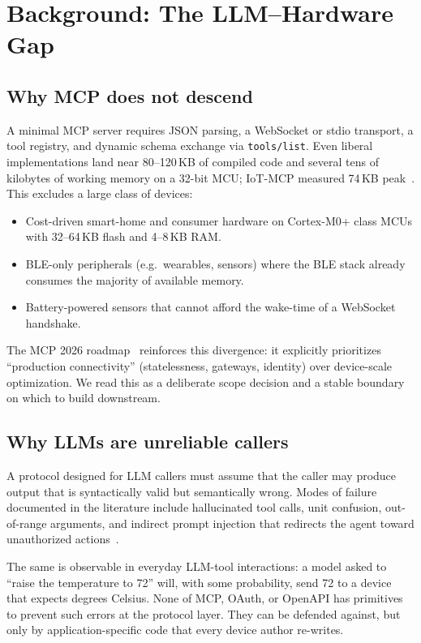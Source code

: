 \documentclass[11pt,a4paper]{article}
\begin{document}
\section{Background: The LLM--Hardware Gap}

\subsection{Why MCP does not descend}

A minimal MCP server requires JSON parsing, a WebSocket or stdio transport,
a tool registry, and dynamic schema exchange via \texttt{tools/list}. Even
liberal implementations land near 80--120\,KB of compiled code and several
tens of kilobytes of working memory on a 32-bit MCU; IoT-MCP measured
74\,KB peak~\cite{iotmcp2025}. This excludes a large class of devices:

\begin{itemize}[leftmargin=*,nosep]
  \item Cost-driven smart-home and consumer hardware on Cortex-M0+ class MCUs
        with 32--64\,KB flash and 4--8\,KB RAM.
  \item BLE-only peripherals (e.g.\ wearables, sensors) where the BLE stack
        already consumes the majority of available memory.
  \item Battery-powered sensors that cannot afford the wake-time of a
        WebSocket handshake.
\end{itemize}

The MCP 2026 roadmap~\cite{mcp_roadmap_2026} reinforces this divergence: it
explicitly prioritizes ``production connectivity'' (statelessness, gateways,
identity) over device-scale optimization. We read this as a deliberate scope
decision and a stable boundary on which to build downstream.

\subsection{Why LLMs are unreliable callers}

A protocol designed for LLM callers must assume that the caller may produce
output that is syntactically valid but semantically wrong. Modes of failure
documented in the literature include hallucinated tool calls, unit confusion,
out-of-range arguments, and indirect prompt injection that redirects the
agent toward unauthorized actions~\cite{llm_hallucination,prompt_injection}.

The same is observable in everyday LLM-tool interactions: a model asked to
``raise the temperature to 72'' will, with some probability, send 72 to a
device that expects degrees Celsius. None of MCP, OAuth, or OpenAPI has
primitives to prevent such errors at the protocol layer. They can be
defended against, but only by application-specific code that every device
author re-writes.
\end{document}
